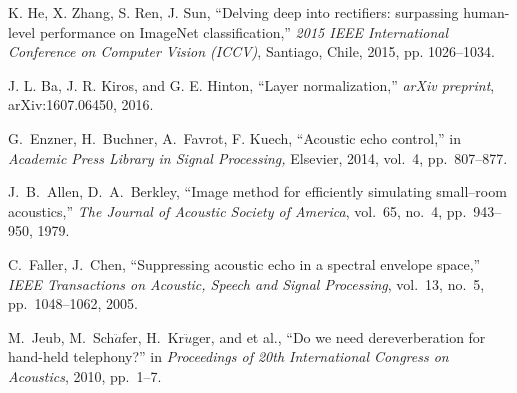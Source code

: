 \documentclass{article}
\begin{document}
\begin{sloppy}
\begin{thebibliography}{9}

    K. He, X. Zhang, S. Ren, J. Sun, ``Delving deep into rectifiers: surpassing human-level performance on ImageNet classification,'' \textit{2015 IEEE International Conference on Computer Vision (ICCV)}, Santiago, Chile, 2015, pp. 1026--1034.

    J. L. Ba, J. R. Kiros, and G. E. Hinton, ``Layer normalization,'' \textit{arXiv preprint}, arXiv:1607.06450, 2016.



    G.\ Enzner, H.\ Buchner, A.\ Favrot, F. Kuech, ``Acoustic echo control,'' in \textit{Academic Press Library in Signal Processing,} Elsevier, 2014, vol.~4, pp.~807--877.



    J.\ B.\ Allen, D.\ A.\ Berkley, ``Image method for efficiently simulating small--room acoustics,'' \textit{The Journal of Acoustic Society of America}, vol.~65, no.~4, pp.~943--950, 1979.

    C.\ Faller, J.\ Chen, ``Suppressing acoustic echo in a spectral
    envelope space,'' \textit{IEEE Transactions on Acoustic, Speech and
    Signal Processing}, vol.~13, no.~5, pp.~1048--1062, 2005.

    M.\ Jeub, M.\ Sch$\ddot{a}$fer, H.\ Kr$\ddot{u}$ger, and et al., ``Do we need dereverberation for hand-held telephony?'' in \textit{Proceedings of 20th International Congress on Acoustics}, 2010, pp.~1--7.

 \end{thebibliography}


\end{sloppy}
\end{document}
